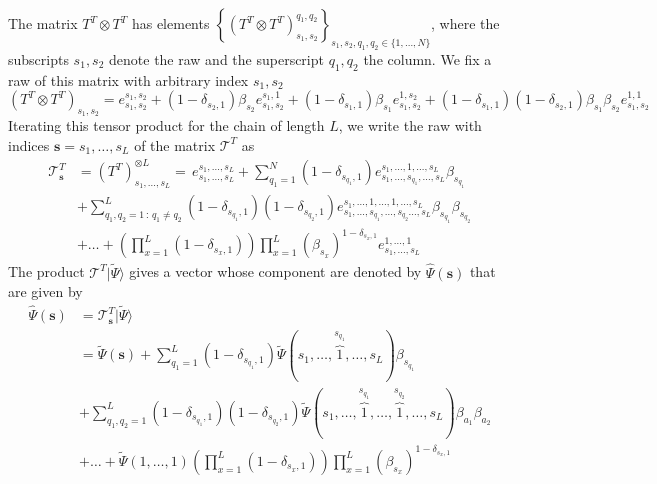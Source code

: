 \documentclass[11pt]{article}
\numberwithin{equation}{section}
\numberwithin{equation}{subsection}
\begin{document}
The matrix $T^{T}\otimes T^{T}$ has elements $\left\{\left(T^{T}\otimes T^{T}\right)_{s_{1},s_{2}}^{q_{1},q_{2}}\right\}_{s_{1},s_{2},q_{1},q_{2}\in \{1,\ldots,N\}}$, where the subscripts $s_{1},s_{2}$ denote the raw and the superscript $q_{1},q_{2}$ the column. We fix a raw of this matrix with arbitrary index $s_{1},s_{2}$
\begin{equation}
	\left(T^{T}\otimes T^{T}\right)_{s_{1},s_{2}}=e_{s_{1},s_{2}}^{s_{1},s_{2}}+(1-\delta_{s_{2},1})\beta_{s_{2}}e_{s_{1},s_{2}}^{s_{1},1}+(1-\delta_{s_{1},1})\beta_{s_{1}}e_{s_{1},s_{2}}^{1,s_{2}}+(1-\delta_{s_{1},1})(1-\delta_{s_{2},1})\beta_{s_{1}}\beta_{s_{2}}e_{s_{1},s_{2}}^{1,1}
\end{equation}
Iterating this tensor product for the chain of length $L$, we write the raw with indices $\bm{s}=s_{1},\ldots,s_{L}$
 of the matrix $\mathcal{T}^{T}$ as 
\begin{equation}
	\begin{split}
		\mathcal{T}^{T}_{\bm{s}}&=\left(T^{T}\right)^{\otimes L}_{s_{1},\ldots,s_{L}}=\,e_{s_{1},\ldots,s_{L}}^{s_{1},\ldots,s_{L}}+\sum_{q_{1}=1}^{N}(1-\delta_{s_{q_{1}},1})e_{s_{1},\ldots,s_{q_{1}},\ldots,s_{L}}^{s_{1},\ldots,1,\ldots,s_{L}}\beta_{s_{q_{1}}}\\&+\sum_{q_{1},q_{2}=1\,:\,q_{1}\neq q_{2}}^{L}(1-\delta_{s_{q_{1}},1})(1-\delta_{s_{q_{2}},1})e_{s_{1},\ldots,s_{q_{1}},\ldots,s_{q_{2}}\ldots,s_{L}}^{s_{1},\ldots,1,\ldots,1,\ldots,s_{L}}\beta_{s_{q_{1}}}\beta_{s_{q_{2}}}
  \\&+
  \ldots+\left(\prod_{x=1}^{L}(1-\delta_{s_{x},1})\right)\prod_{x=1}^{L}\left(\beta_{s_{x}}\right)^{1-\delta_{s_{x},1}}e_{s_{1},\ldots,s_{L}}^{1,\ldots,1}
	\end{split}
\end{equation}
The product $\mathcal{T}^{T}|\widetilde{\Psi}\rangle$ gives a vector whose component are denoted by $\widehat{\Psi}(\bm{s})$ that are given by 
\begin{equation}\label{ABS_intermediate}
	\begin{split}
		\widehat{\Psi}(\mathbf{s})&=\mathcal{T}^{T}_{\bm{s}}|\widetilde{\Psi}\rangle\\&= \widetilde{\Psi}(\mathbf{s})+\sum_{q_{1}= 1}^{L}(1-\delta_{s_{q_{1}},1})\widetilde{\Psi}(s_{1},\ldots,\overbrace{1}^{s_{q_{1}}},\ldots,s_{L})\beta_{s_{q_{1}}}\\&+
		\sum_{q_{1},q_{2}= 1}^{L}(1-\delta_{s_{q_{1}},1})(1-\delta_{s_{q_{2}},1})\widetilde{\Psi}(s_{1},\ldots,\overbrace{1}^{s_{q_{1}}},\ldots,\overbrace{1}^{s_{q_{2}}},\ldots,s_{L})\beta_{a_{1}}\beta_{a_{2}}\\&+\ldots+\widetilde{\Psi}(1,\ldots,1)\left(\prod_{x=1}^{L}(1-\delta_{s_{x},1})\right)\prod_{x=1}^{L}\left(\beta_{s_{x}}\right)^{1-\delta_{s_{x},1}}
	\end{split}
\end{equation}
\end{document}
